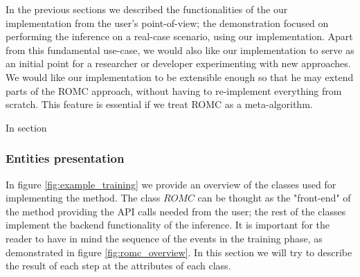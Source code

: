 In the previous sections we described the functionalities of the our
implementation from the user's point-of-view; the demonstration
focused on performing the inference on a real-case scenario, using our
implementation. Apart from this fundamental use-case, we would also
like our implementation to serve as an initial point for a researcher
or developer experimenting with new approaches. We would like our
implementation to be extensible enough so that he may extend parts of
the ROMC approach, without having to re-implement everything from
scratch. This feature is essential if we treat ROMC as a
meta-algorithm.


In section 


\subsubsection{Entities presentation}

In figure \ref{fig:example_training} we provide an overview of the
classes used for implementing the method. The class $\textit{ROMC}$
can be thought as the "front-end" of the method providing the API
calls needed from the user; the rest of the classes implement the
backend functionality of the inference. It is important for the reader
to have in mind the sequence of the events in the training phase, as
demonstrated in figure \ref{fig:romc_overview}. In this section we
will try to describe the result of each step at the attributes of each
class.

